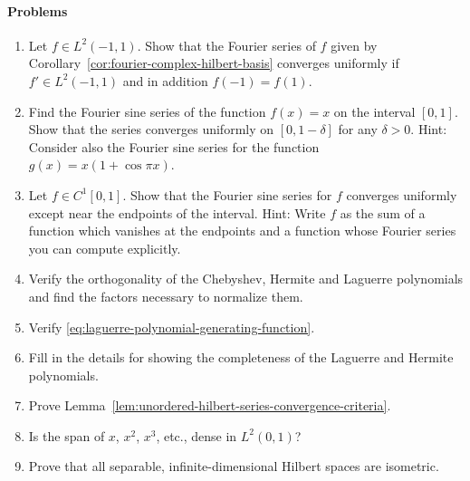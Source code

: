 \paragraph*{Problems}

\begin{enumerate}[label=\thesection.\arabic*.,ref=\thesection.\arabic*,start=15,series=book-problems]

\item\label{ex:periodic-fourier-uniform-convergence} Let $f\in L^2(-1,1)$. Show that the Fourier series of $f$ given by Corollary~\ref{cor:fourier-complex-hilbert-basis} converges uniformly if $f'\in L^2(-1,1)$ and in addition $f(-1)=f(1)$.

\item\label{ex:fourier-sine-series-linear-function} Find the Fourier sine series of the function $f(x)=x$ on the interval $[0,1]$. Show that the series converges uniformly on $[0,1-\delta]$ for any $\delta>0$. Hint: Consider also the Fourier sine series for the function $g(x)=x(1+\cos\pi x)$.

\item\label{ex:fourier-sine-series-interior-uniform-convergence} Let $f\in C^1[0,1]$. Show that the Fourier sine series for $f$ converges uniformly except near the endpoints of the interval. Hint: Write $f$ as the sum of a function which vanishes at the endpoints and a function whose Fourier series you can compute explicitly.

\item\label{ex:classical-polynomials-orthogonality-normalization} Verify the orthogonality of the Chebyshev, Hermite and Laguerre polynomials and find the factors necessary to normalize them.

\item\label{ex:laguerre-generating-function} Verify \eqref{eq:laguerre-polynomial-generating-function}.

\item\label{ex:laguerre-hermite-completeness-details} Fill in the details for showing the completeness of the Laguerre and Hermite polynomials.

\item\label{ex:hilbert-series-convergence-criteria} Prove Lemma~\ref{lem:unordered-hilbert-series-convergence-criteria}.

\item\label{ex:positive-power-span-lp-two-density} Is the span of $x$, $x^2$, $x^3$, etc., dense in $L^2(0,1)$?

\item\label{ex:separable-infinite-hilbert-spaces-isometry} Prove that all separable, infinite-dimensional Hilbert spaces are isometric.

\end{enumerate}
